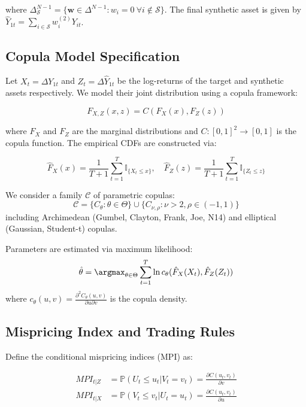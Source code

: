 where $\Delta^{N-1}_{\mathcal{S}} = \{\mathbf{w} \in \Delta^{N-1} : w_i = 0\ \forall i \notin \mathcal{S}\}$. The final synthetic asset is given by $\hat{Y}_{1t} = \sum_{i \in \mathcal{S}} w_i^{(2)} Y_{it}$.

\subsection{Copula Model Specification}
Let $X_t = \Delta Y_{1t}$ and $Z_t = \Delta \hat{Y}_{1t}$ be the log-returns of the target and synthetic assets respectively. We model their joint distribution using a copula framework:

\begin{equation}
F_{X,Z}(x,z) = C(F_X(x), F_Z(z))
\end{equation}

where $F_X$ and $F_Z$ are the marginal distributions and $C:[0,1]^2 \rightarrow [0,1]$ is the copula function. The empirical CDFs are constructed via:

\begin{equation}
\hat{F}_X(x) = \frac{1}{T+1}\sum_{t=1}^T \mathbb{I}_{\{X_t \leq x\}},\quad \hat{F}_Z(z) = \frac{1}{T+1}\sum_{t=1}^T \mathbb{I}_{\{Z_t \leq z\}}
\end{equation}

We consider a family $\mathcal{C}$ of parametric copulas:
\begin{equation}
\mathcal{C} = \{C_\theta : \theta \in \Theta\} \cup \{C_{\nu,\rho} : \nu > 2, \rho \in (-1,1)\}
\end{equation}
including Archimedean (Gumbel, Clayton, Frank, Joe, N14) and elliptical (Gaussian, Student-t) copulas.

Parameters are estimated via maximum likelihood:
\begin{equation}
\hat{\theta} = \argmax_{\theta \in \Theta} \sum_{t=1}^T \ln c_\theta(\hat{F}_X(X_t), \hat{F}_Z(Z_t))
\end{equation}
where $c_\theta(u,v) = \frac{\partial^2 C_\theta(u,v)}{\partial u \partial v}$ is the copula density.

\subsection{Mispricing Index and Trading Rules}
Define the conditional mispricing indices (MPI) as:

\begin{align}
MPI_{t|Z} &= \mathbb{P}(U_t \leq u_t | V_t = v_t) = \frac{\partial C(u_t,v_t)}{\partial v} \\
MPI_{t|X} &= \mathbb{P}(V_t \leq v_t | U_t = u_t) = \frac{\partial C(u_t,v_t)}{\partial u}
\end{align}

